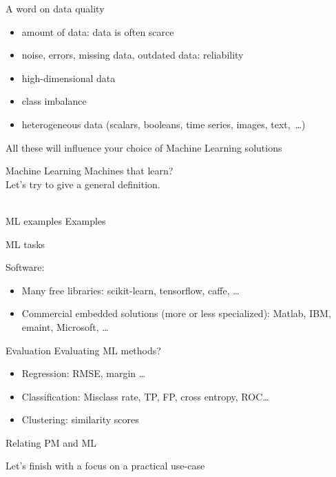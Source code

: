 \documentclass{beamer}
\begin{document}
\begin{frame}{A word on data quality}
\begin{itemize}
\item amount of data: data is often scarce
\item noise, errors, missing data, outdated data: reliability
\item high-dimensional data
\item class imbalance
\item heterogeneous data (scalars, booleans, time series, images, text, \ldots)
\end{itemize}
All these will influence your choice of Machine Learning solutions
\end{frame}

\begin{frame}{Machine Learning}
\centering
Machines that learn?\\
Let's try to give a general definition.\\
~\\
\end{frame}

\begin{frame}{ML examples}
Examples
\end{frame}

\begin{frame}{ML tasks}

Software:
\begin{itemize}
\item Many free libraries: scikit-learn, tensorflow, caffe, \ldots
\item Commercial embedded solutions (more or less specialized): Matlab, IBM, emaint, Microsoft, \ldots
\end{itemize}
\end{frame}

\begin{frame}{Evaluation}
Evaluating ML methods?
\begin{itemize}
\item Regression: RMSE, margin \ldots
\item Classification: Misclass rate, TP, FP, cross entropy, ROC\ldots
\item Clustering: similarity scores
\end{itemize}
\end{frame}

\begin{frame}{Relating PM and ML}

\end{frame}

\begin{frame}{Let's finish with a focus on a practical use-case}

\end{frame}
\end{document}

